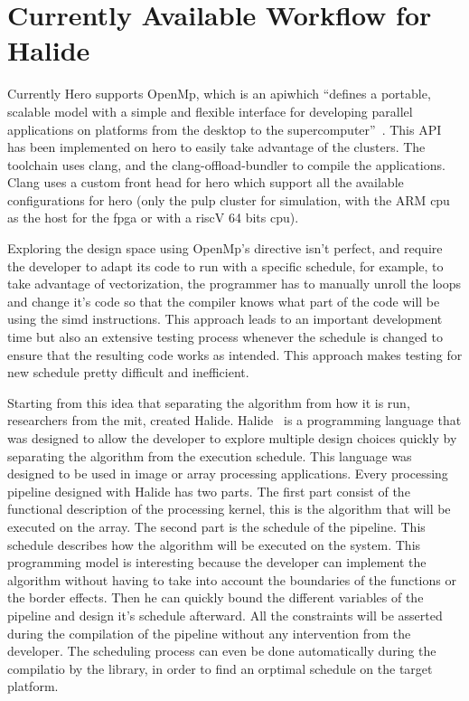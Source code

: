 \section {Currently Available Workflow for Halide}
	Currently Hero supports OpenMp, which is an \gls{api}which ``defines a portable, scalable model with a simple and flexible interface for developing parallel applications on platforms from the desktop to the supercomputer''~\cite{Web:OpenMp}. This API has been implemented on hero to easily take advantage of the clusters. The toolchain uses clang, and the clang-offload-bundler to compile the applications. Clang uses a custom front head for hero which support all the available configurations for hero (only the pulp cluster for simulation, with the ARM \gls{cpu} as the host for the \gls{fpga} or with a riscV 64 bits \gls{cpu}).

	Exploring the design space using OpenMp's directive isn't perfect, and require the developer to adapt its code to run with a specific schedule, for example, to take advantage of vectorization, the programmer has to manually unroll the loops and change it's code so that the compiler knows what part of the code will be using the \gls{simd} instructions. This approach leads to an important development time but also an extensive testing process whenever the schedule is changed to ensure that the resulting code works as intended. This approach makes testing for new schedule pretty difficult and inefficient. 

	Starting from this idea that separating the algorithm from how it is run, researchers from the \gls{mit}, created Halide. 
    Halide~\cite{Art:Halide} is a programming language that was designed to allow the developer to explore multiple design choices quickly by separating the algorithm from the execution schedule. This language was designed to be used in image or array processing applications.
    Every processing pipeline designed with Halide has two parts. The first part consist of the functional description of the processing kernel, this is the algorithm that will be executed on the array. The second part is the schedule of the pipeline. This schedule describes how the algorithm will be executed on the system. This programming model is interesting because the developer can implement the algorithm without having to take into account the boundaries of the functions or the border effects. Then he can quickly bound the different variables of the pipeline and design it's schedule afterward. All the constraints will be asserted during the compilation of the pipeline  without any intervention from the developer. The scheduling process can even be done automatically during the compilatio by the library, in order to find an orptimal schedule on the target platform.


